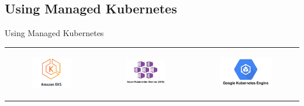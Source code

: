 \documentclass{beamer}
\begin{document}
\subsection{Using Managed Kubernetes}
\begin{frame}{Using Managed Kubernetes}%
\begin{center}
	\begin{tabular}{ c c c}
		\begin{figure}
			\includegraphics[width=3cm]{figures/managed-aws-eks.png}
			\label{fig:managed-aws-eks}
		\end{figure} &
		\begin{figure}
			\includegraphics[width=3cm]{figures/managed-azure-kubernetes-service-aks.png}
			\label{fig:managed-azure-kubernetes-service-aks}
		\end{figure} &
		\begin{figure}
			\includegraphics[width=4cm]{figures/managed-gcp-gke.png}
			\label{fig:managed-gcp-gke}
		\end{figure}
	\end{tabular}
\end{center}
\end{frame}
\end{document}
